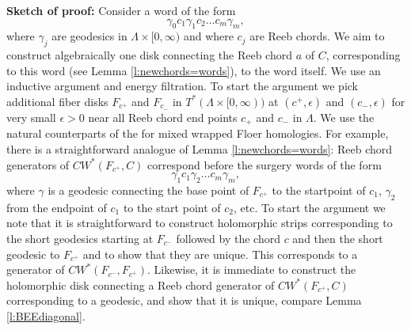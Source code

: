 \documentclass{gtpart}
\begin{document}
{\bf Sketch of proof:} 
Consider a word of the form
\[ 
\gamma_{0}c_{1}\gamma_{1} c_{2}\dots c_{m}\gamma_{m},
\]
where $\gamma_{j}$ are geodesics in $\Lambda\times[0,\infty)$ and where $c_{j}$ are Reeb chords. We aim to construct algebraically one disk connecting the Reeb chord $a$ of $C$, corresponding to this word (see Lemma \ref{l:newchords=words}), to the word itself. We use an inductive argument and energy filtration. To start the argument we pick additional fiber disks $F_{c^{+}}$ and $F_{c_{-}}$ in $T^{\ast}(\Lambda\times[0,\infty))$ at $(c^{+},\epsilon)$ and $(c_{-},\epsilon)$ for very small $\epsilon>0$ near all Reeb chord end points $c_{+}$ and $c_{-}$ in $\Lambda$. We use the natural counterparts of the for mixed wrapped Floer homologies. For example, there is a straightforward analogue of Lemma \ref{l:newchords=words}: Reeb chord generators of $CW^{\ast}(F_{c^{+}},C)$ correspond before the surgery words of the form
\[
\gamma_{1}c_{1}\gamma_{2}\dots c_{m}\gamma_{m},
\]
where $\gamma$ is a geodesic connecting the base point of $F_{c^{+}}$ to the startpoint of $c_{1}$,
$\gamma_{2}$ from the endpoint of $c_{1}$ to the start point of $c_{2}$, etc. To start the argument
we note that it is straightforward to construct holomorphic strips corresponding to the short
geodesics starting at $F_{c^{-}}$ followed by the chord $c$ and then the short geodesic to
$F_{c^{+}}$ and to show that they are unique. This corresponds to a generator of
$CW^*(F_{c^{-}},F_{c^{+}})$. Likewise, it is immediate to construct the holomorphic disk connecting a
Reeb chord generator of $CW^*(F_{c^{+}},C)$ corresponding to a geodesic, and show that it is unique, compare Lemma \ref{l:BEEdiagonal}. 
\end{document}
